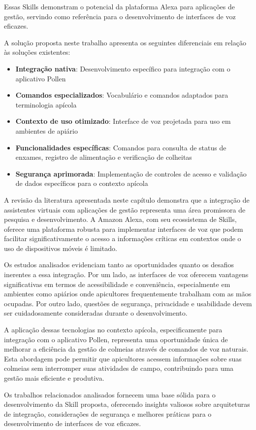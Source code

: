 Essas Skills demonstram o potencial da plataforma Alexa para aplicações de gestão, servindo como referência para o desenvolvimento de interfaces de voz eficazes.


A solução proposta neste trabalho apresenta os seguintes diferenciais em relação às soluções existentes:

\begin{itemize}
    \item \textbf{Integração nativa}: Desenvolvimento específico para integração com o aplicativo Pollen
    \item \textbf{Comandos especializados}: Vocabulário e comandos adaptados para terminologia apícola
    \item \textbf{Contexto de uso otimizado}: Interface de voz projetada para uso em ambientes de apiário
    \item \textbf{Funcionalidades específicas}: Comandos para consulta de status de enxames, registro de alimentação e verificação de colheitas
    \item \textbf{Segurança aprimorada}: Implementação de controles de acesso e validação de dados específicos para o contexto apícola
\end{itemize}


A revisão da literatura apresentada neste capítulo demonstra que a integração de assistentes virtuais com aplicações de gestão representa uma área promissora de pesquisa e desenvolvimento. 
A Amazon Alexa, com seu ecossistema de Skills, oferece uma plataforma robusta para implementar interfaces de voz que podem facilitar significativamente o acesso a informações críticas em contextos onde o uso de dispositivos móveis é limitado.

Os estudos analisados evidenciam tanto as oportunidades quanto os desafios inerentes a essa integração. Por um lado, as interfaces de voz oferecem vantagens significativas em termos de acessibilidade e conveniência, 
especialmente em ambientes como apiários onde apicultores frequentemente trabalham com as mãos ocupadas. Por outro lado, questões de segurança, privacidade e usabilidade devem ser cuidadosamente consideradas durante o desenvolvimento.

A aplicação dessas tecnologias no contexto apícola, especificamente para integração com o aplicativo Pollen, representa uma oportunidade única de melhorar a eficiência da gestão de colmeias através de comandos de voz naturais. 
Esta abordagem pode permitir que apicultores acessem informações sobre suas colmeias sem interromper suas atividades de campo, contribuindo para uma gestão mais eficiente e produtiva.

Os trabalhos relacionados analisados fornecem uma base sólida para o desenvolvimento da Skill proposta, oferecendo insights valiosos sobre arquiteturas de integração, considerações de segurança e melhores práticas para o desenvolvimento de interfaces de voz eficazes.
















